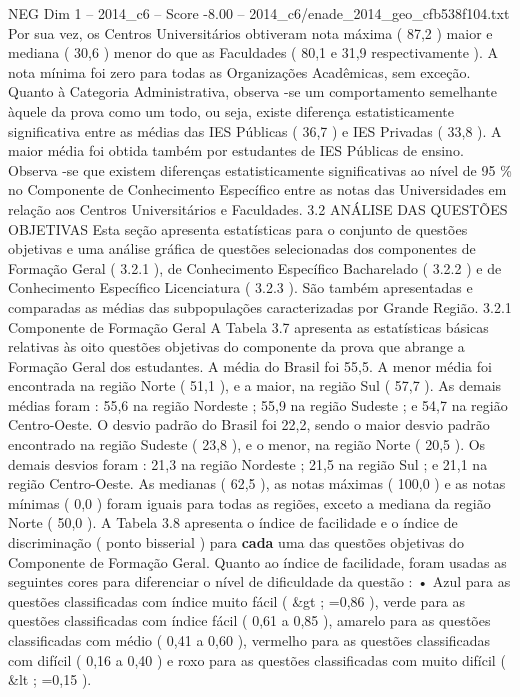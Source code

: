 \begin{textsample}{NEG Dim 1 – 2014\_c6 – Score -8.00 – 2014\_c6/enade\_2014\_geo\_cfb538f104.txt}
Por sua vez, os Centros Universitários obtiveram nota máxima ( 87,2 ) maior e mediana ( 30,6 ) menor do que as Faculdades ( 80,1 e 31,9 respectivamente ).
A nota mínima foi zero para todas as Organizações Acadêmicas, sem exceção.
Quanto à Categoria Administrativa, observa -se um comportamento semelhante àquele da prova como um todo, ou seja, existe diferença estatisticamente significativa entre as médias das IES Públicas ( 36,7 ) e IES Privadas ( 33,8 ).
A maior média foi obtida também por estudantes de IES Públicas de ensino.
Observa -se que existem diferenças estatisticamente significativas ao nível de 95 \% no Componente de Conhecimento Específico entre as notas das Universidades em relação aos Centros Universitários e Faculdades. 3.2 ANÁLISE DAS QUESTÕES OBJETIVAS Esta seção apresenta estatísticas para o conjunto de questões objetivas e uma análise gráfica de questões selecionadas dos componentes de Formação Geral ( 3.2.1 ), de Conhecimento Específico Bacharelado ( 3.2.2 ) e de Conhecimento Específico Licenciatura ( 3.2.3 ).
São também apresentadas e comparadas as médias das subpopulações caracterizadas por Grande Região. 3.2.1 Componente de Formação Geral A Tabela 3.7 apresenta as estatísticas básicas relativas às oito questões objetivas do componente da prova que abrange a Formação Geral dos estudantes.
A média do Brasil foi 55,5.
A menor média foi encontrada na região Norte ( 51,1 ), e a maior, na região Sul ( 57,7 ).
As demais médias foram : 55,6 na região Nordeste ; 55,9 na região Sudeste ; e 54,7 na região Centro-Oeste.
O desvio padrão do Brasil foi 22,2, sendo o maior desvio padrão encontrado na região Sudeste ( 23,8 ), e o menor, na região Norte ( 20,5 ).
Os demais desvios foram : 21,3 na região Nordeste ; 21,5 na região Sul ; e 21,1 na região Centro-Oeste.
As medianas ( 62,5 ), as notas máximas ( 100,0 ) e as notas mínimas ( 0,0 ) foram iguais para todas as regiões, exceto a mediana da região Norte ( 50,0 ).
A Tabela 3.8 apresenta o índice de facilidade e o índice de discriminação ( ponto bisserial ) para \textbf{cada} uma das questões objetivas do Componente de Formação Geral.
Quanto ao índice de facilidade, foram usadas as seguintes cores para diferenciar o nível de dificuldade da questão : • Azul para as questões classificadas com índice muito fácil ( \&gt ; =0,86 ), verde para as questões classificadas com índice fácil ( 0,61 a 0,85 ), amarelo para as questões classificadas com médio ( 0,41 a 0,60 ), vermelho para as questões classificadas com difícil ( 0,16 a 0,40 ) e roxo para as questões classificadas com muito difícil ( \&lt ; =0,15 ).

\end{textsample}
